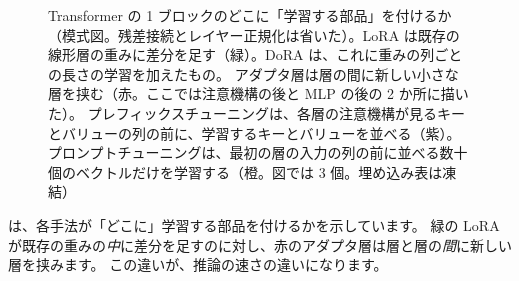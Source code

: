 \begin{figure}[tbp]
\caption{Transformer の 1 ブロックのどこに「学習する部品」を付けるか（模式図。残差接続とレイヤー正規化は省いた）。LoRA は既存の線形層の重みに差分を足す（緑）。DoRA は、これに重みの列ごとの長さの学習を加えたもの。
アダプタ層は層の間に新しい小さな層を挟む（赤。ここでは注意機構の後と MLP の後の 2 か所に描いた）。
プレフィックスチューニングは、各層の注意機構が見るキーとバリューの列の前に、学習するキーとバリューを並べる（紫）。
プロンプトチューニングは、最初の層の入力の列の前に並べる数十個のベクトルだけを学習する（橙。図では 3 個。埋め込み表は凍結）}
\label{fig:lora-peft-map}
\end{figure}

は、各手法が「どこに」学習する部品を付けるかを示しています。
緑の LoRA が既存の重みの\emph{中}に差分を足すのに対し、赤のアダプタ層は層と層の\emph{間}に新しい層を挟みます。
この違いが、推論の速さの違いになります。

